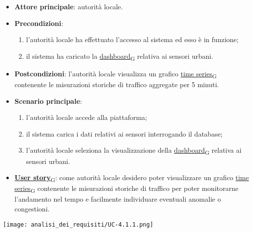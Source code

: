 \newpage
{}
\begin{itemize}
	\item \textbf{Attore principale}: autorità locale.
	\item \textbf{Precondizioni}:
	      \begin{enumerate}
		      \item l'autorità locale ha effettuato l'accesso al sistema ed esso è in funzione;
		      \item il sistema ha caricato la \href{https://7last.github.io/docs/pb/documentazione-interna/glossario\#dashboard}{dashboard\textsubscript{G}} relativa ai sensori urbani.
	      \end{enumerate}
	\item \textbf{Postcondizioni}: l'autorità locale visualizza un grafico \href{https://7last.github.io/docs/pb/documentazione-interna/glossario\#time-series}{time series\textsubscript{G}} contenente le misurazioni storiche di traffico aggregate per 5 minuti.
	\item \textbf{Scenario principale}:
	      \begin{enumerate}
		      \item l'autorità locale accede alla piattaforma;
		      \item il sistema carica i dati relativi ai sensori interrogando il database;
		      \item l'autorità locale seleziona la visualizzazione della \href{https://7last.github.io/docs/pb/documentazione-interna/glossario\#dashboard}{dashboard\textsubscript{G}} relativa ai sensori urbani.
	      \end{enumerate}
	\item \href{https://7last.github.io/docs/pb/documentazione-interna/glossario\#user-story}{\textbf{User story}\textsubscript{G}}:
	      come autorità locale desidero poter visualizzare un grafico \href{https://7last.github.io/docs/pb/documentazione-interna/glossario\#time-series}{time series\textsubscript{G}} contenente le misurazioni storiche
	      di traffico per poter monitorarne l'andamento nel tempo e facilmente individuare eventuali anomalie
	      o congestioni.
\end{itemize}
\begin{center}
	\texttt{[image: analisi\_dei\_requisiti/UC-4.1.1.png]}
\end{center}

